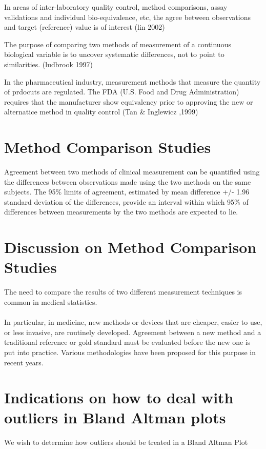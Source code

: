 \documentclass[12pt, a4paper]{report}
\theoremstyle{plain}
\theoremstyle{definition}
\theoremstyle{remark}
\begin{document}
	In areas of inter-laboratory quality control, method comparisons, assay validations and individual bio-equivalence, etc, the agree between observations and target (reference) value is
	of interest (lin 2002)
	
	The purpose of comparing two methods of measurement of a continuous biological variable is to uncover systematic differences, not to point to
	similarities. (ludbrook 1997)
	
	In the pharmaceutical industry, measurement methods that measure the quantity of prdocuts are regulated. The FDA (U.S. Food and
	Drug Administration) requires that the manufacturer show equivalency prior to approving the new or alternatice method in quality control (Tan \& Inglewicz ,1999)
	
	\section{Method Comparison Studies}
	
	Agreement between two methods of clinical measurement can be quantified using the differences between observations made using the two methods on the same subjects. The 95\% limits of agreement, estimated by mean difference +/- 1.96 standard deviation of the differences, provide an interval within which 95\% of differences between measurements by the two methods are expected to lie.
	
	\section{Discussion on Method Comparison Studies}
	
	The need to compare the results of two different measurement
	techniques is common in medical statistics.
	\\
	\\
	In particular, in medicine, new methods or devices that are
	cheaper, easier to use, or less invasive, are routinely developed.
	Agreement between a new method and a traditional reference or gold
	standard must be evaluated before the new one is put into
	practice. Various methodologies have been proposed for this
	purpose in recent years.
	
	\section{Indications on how to deal with outliers in Bland Altman plots}

	We wish to determine how outliers should be treated in a Bland
	Altman Plot
	
\end{document}
